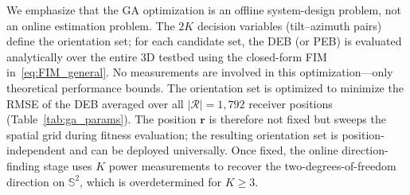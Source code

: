\documentclass[journal]{IEEEtran}
\begin{document}
We emphasize that the GA optimization is an offline system-design problem, not an online estimation problem. The $2K$ decision variables (tilt--azimuth pairs) define the orientation set; for each candidate set, the DEB (or PEB) is evaluated analytically over the entire 3D testbed using the closed-form FIM in~\eqref{eq:FIM_general}. No measurements are involved in this optimization---only theoretical performance bounds. The orientation set is optimized to minimize the RMSE of the DEB averaged over all $|\mathcal{R}|=1{,}792$ receiver positions (Table~\ref{tab:ga_params}). The position $\mathbf{r}$ is therefore not fixed but sweeps the spatial grid during fitness evaluation; the resulting orientation set is position-independent and can be deployed universally. Once fixed, the online direction-finding stage uses $K$ power measurements to recover the two-degrees-of-freedom direction on $\mathbb{S}^2$, which is overdetermined for $K\ge3$.
\end{document}
